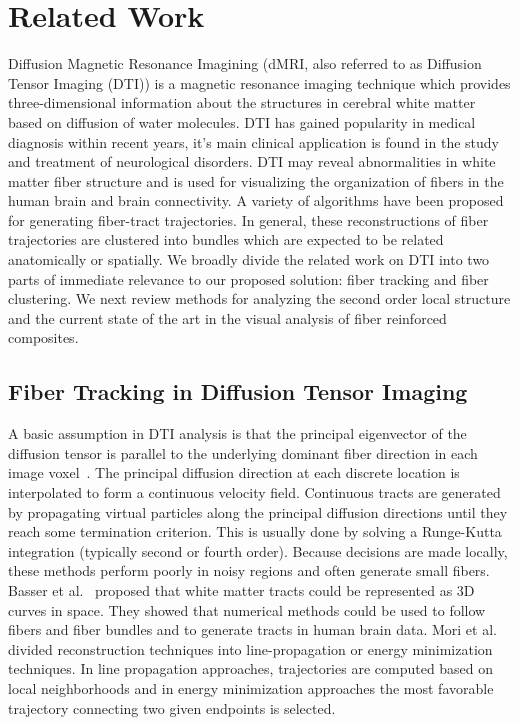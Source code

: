 \section{Related Work}
Diffusion Magnetic Resonance Imagining (dMRI, also referred to as Diffusion Tensor Imaging (DTI)) is a magnetic resonance imaging technique which provides three-dimensional information about the structures in cerebral white matter based on diffusion of water molecules. DTI has gained popularity in medical diagnosis within recent years, it's main clinical application is found in the study and treatment of neurological disorders. DTI may reveal abnormalities in white matter fiber structure and is used for visualizing the organization of fibers in the human brain and brain connectivity.
A variety of algorithms have been proposed for generating fiber-tract trajectories. In general, these reconstructions of fiber trajectories are clustered into bundles which are expected to be related anatomically or spatially. 
We broadly divide the related work on DTI into two parts of immediate relevance to our proposed solution: fiber tracking and fiber clustering. We next review methods for analyzing the second order local structure and the current state of the art in the visual analysis of fiber reinforced composites.
\subsection {Fiber Tracking in Diffusion Tensor Imaging}
\label{subsec:fiberEx} 
A basic assumption in DTI analysis is that the principal eigenvector of the diffusion tensor is parallel to the underlying dominant fiber direction in each image voxel~\cite{Basser2002, Mori1999, Mori2002}. The principal diffusion direction at each discrete location is interpolated to form a continuous velocity field. Continuous tracts are generated by propagating virtual particles along the principal diffusion directions until they reach some termination criterion. 
This is usually done by solving a Runge-Kutta integration (typically second or fourth order).
Because decisions are made locally, these methods perform poorly in noisy regions and often generate small fibers. Basser et al.~\cite{Basser2000,Basser2002} proposed that white matter tracts could be represented as 3D curves in space. They showed that numerical methods could be used to follow fibers and fiber bundles and to generate tracts in human brain data. 
Mori et al.~\cite{Mori1999,Mori2002} divided reconstruction techniques into line-propagation or energy minimization techniques. In line propagation approaches, trajectories are computed based on local neighborhoods and in energy minimization approaches the most favorable trajectory connecting two given endpoints is selected. 


